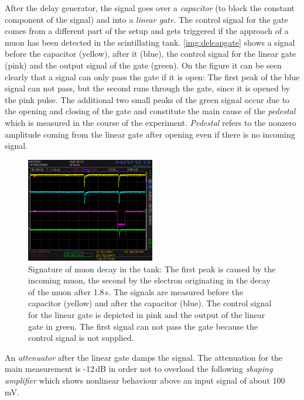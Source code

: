 After the delay generator, the signal goes over a \emph{capacitor} (to block the constant component of the signal)
and into a \emph{linear gate}.
The control signal for the gate comes from a different part of the setup and gets triggered
if the approach of a muon has been detected in the scintillating tank.
\autoref{img:delcapgate} shows a signal before the capacitor (yellow), after it (blue),
the control signal for the linear gate (pink) and the output signal of the gate (green).
On the figure it can be seen clearly that a signal can only pass the gate if it is open:
The first peak of the blue signal can not pass, but the second runs through the gate,
since it is opened by the pink pulse.
The additional two small peaks of the green signal occur due to the opening and closing of the gate
and constitute the main cause of the \emph{pedestal} which is measured in the course of the experiment.
\emph{Pedestal} refers to the nonzero amplitude coming from the linear gate after opening
even if there is no incoming signal.
\begin{figure}[H]
\begin{center}
  \includegraphics[width=0.5\textwidth]{../img/S0014.PNG}
  \caption{Signature of muon decay in the tank: The first peak is caused by the incoming muon,
  the second by the electron originating in the decay of the muon after 1.8\,\textmu s.
  The signals are measured before the capacitor (yellow) and after the capacitor (blue).
  The control signal for the linear gate is depicted in pink and the output of the linear gate in green.
  The first signal can not pass the gate because the control signal is not supplied.}
  \label{img:delcapgate}
\end{center}
\end{figure}
An \emph{attenuator} after the linear gate damps the signal.
The attenuation for the main measurement is -12\,dB in order not to overload the following \emph{shaping amplifier}
which shows nonlinear behaviour above an input signal of about 100\,mV.

